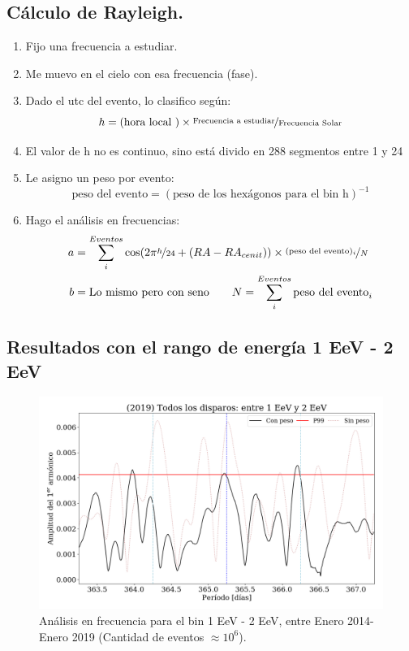  



\subsection{Cálculo de Rayleigh.}


 \begin{enumerate}
   \item Fijo una frecuencia a estudiar.
   \item Me muevo en el cielo con esa frecuencia (fase).
   \item Dado el utc del evento, lo clasifico según:
   \begin{equation*}
     h = (\text{hora local })\times \nicefrac{\text{Frecuencia a estudiar}}{\text{Frecuencia Solar}}
   \end{equation*}
     \item El valor de h no es continuo, sino está divido en 288 segmentos entre 1 y 24
  \item Le asigno un peso por evento:
   \begin{equation*}
     \text{peso del evento} = (\text{peso  de los hexágonos para el bin h})^{-1}
     \end{equation*} 
    \item Hago el análisis en frecuencias:
    \begin{align*}
        a &= \sum^{Eventos}_i \cos(2\pi \nicefrac{h}{24} + (RA -RA_{cenit}))\times \nicefrac{(\text{peso del evento})_i}{N}\\
        b &= \text{Lo mismo pero con seno}\qquad         N = \sum^{Eventos}_i \text{peso del evento}_i
    \end{align*}
 \end{enumerate}

 



\subsection{Resultados con el rango de energía 1 EeV - 2 EeV}



\begin{figure}[htbp]
  \centering
  \includegraphics[width=\textwidth]{./../../Python/xx2019_AllTriggers_1_2_EeV_con_vs_sin_peso.png}
  \caption{Análisis en frecuencia para el bin 1 EeV - 2 EeV, entre Enero 2014- Enero 2019 (Cantidad de eventos $ \approx 10^6$).}
\end{figure}

 



